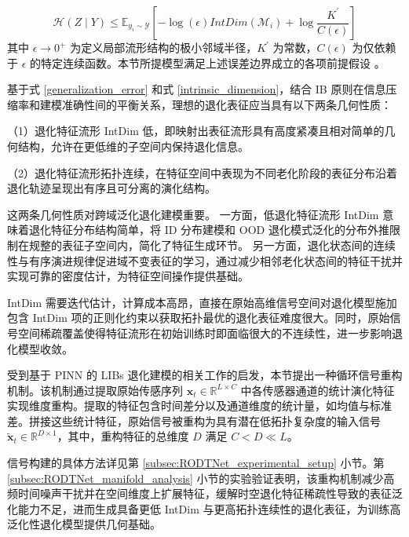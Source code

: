 \begin{equation}
    \mathcal{H}(Z \mid Y) \leq \mathbb{E}_{{y}_{i} \sim \mathcal{Y}}[-\log(\epsilon)IntDim(\mathcal{M}_i)+\log\frac{K^{\prime}}{C(\epsilon)}]
    \label{intrinsic_dimension} 
\end{equation}
% 
其中 $\epsilon \to 0^+$ 为定义局部流形结构的极小邻域半径，$K^{\prime}$ 为常数，$C(\epsilon)$ 为仅依赖于 $\epsilon$ 的特定连续函数。本节所提模型满足上述误差边界成立的各项前提假设 \cite{Ghosh_Motani_2023, 10.5555/3692070.3694510}。

基于式 \eqref{generalization_error} 和式 \eqref{intrinsic_dimension}，结合 IB 原则在信息压缩率和建模准确性间的平衡关系，理想的退化表征应当具有以下两条几何性质：

（1）退化特征流形 IntDim 低，即映射出表征流形具有高度紧凑且相对简单的几何结构，允许在更低维的子空间内保持退化信息。

（2）退化特征流形拓扑连续，在特征空间中表现为不同老化阶段的表征分布沿着退化轨迹呈现出有序且可分离的演化结构。

这两条几何性质对跨域泛化退化建模重要。
一方面，低退化特征流形 IntDim 意味着退化特征分布结构简单，将 ID 分布建模和 OOD 退化模式泛化的分布外推限制在规整的表征子空间内，简化了特征生成环节。
% 
另一方面，退化状态间的连续性与有序演进规律促进域不变表征的学习，通过减少相邻老化状态间的特征干扰并实现可靠的密度估计，为特征空间操作提供基础。

IntDim 需要迭代估计，计算成本高昂，直接在原始高维信号空间对退化模型施加包含 IntDim 项的正则化约束以获取拓扑最优的退化表征难度很大。同时，原始信号空间稀疏覆盖使得特征流形在初始训练时即面临很大的不连续性，进一步影响退化模型收敛。

受到基于 PINN \cite{wang2024physics, 10251604} 的 LIBs 退化建模的相关工作的启发，本节提出一种循环信号重构机制。该机制通过提取原始传感序列 $\boldsymbol{x}_{t} \in \mathbb{R} ^ {L \times C}$ 中各传感器通道的统计演化特征实现维度重构。提取的特征包含时间差分以及通道维度的统计量，如均值与标准差。拼接这些统计特征，原始信号被重构为具有潜在低拓扑复杂度的输入信号 $\boldsymbol{\widetilde{x}}_{t} \in \mathbb{R} ^ {D \times 1}$，其中，重构特征的总维度 $D$ 满足 $C < D \ll L$。

信号构建的具体方法详见第 \ref{subsec:RODTNet_experimental_setup} 小节。第 \ref{subsec:RODTNet_manifold_analysis} 小节的实验验证表明，该重构机制减少高频时间噪声干扰并在空间维度上扩展特征，缓解时空退化特征稀疏性导致的表征泛化能力不足，进而生成具备更低 IntDim 与更高拓扑连续性的退化表征，为训练高泛化性退化模型提供几何基础。

